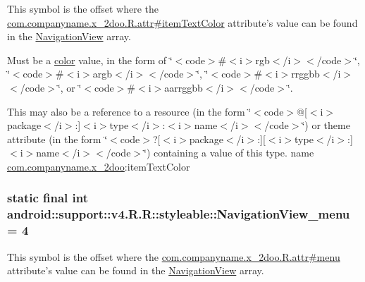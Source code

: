 This symbol is the offset where the \hyperlink{classcom_1_1companyname_1_1x__2doo_1_1_r_1_1attr_6d1d4faf528fcb60014cc0da91efab94}{com.companyname.x\_\-2doo.R.attr\#itemTextColor} attribute's value can be found in the \hyperlink{classandroid_1_1support_1_1v4_1_1_r_1_1styleable_5278cd545a73a5a4af313995900ae2d8}{NavigationView} array.

Must be a \hyperlink{classandroid_1_1support_1_1v4_1_1_r_1_1color}{color} value, in the form of \char`\"{}$<$code$>$\#$<$i$>$rgb$<$/i$>$$<$/code$>$\char`\"{}, \char`\"{}$<$code$>$\#$<$i$>$argb$<$/i$>$$<$/code$>$\char`\"{}, \char`\"{}$<$code$>$\#$<$i$>$rrggbb$<$/i$>$$<$/code$>$\char`\"{}, or \char`\"{}$<$code$>$\#$<$i$>$aarrggbb$<$/i$>$$<$/code$>$\char`\"{}. 

This may also be a reference to a resource (in the form \char`\"{}$<$code$>$@\mbox{[}$<$i$>$package$<$/i$>$:\mbox{]}$<$i$>$type$<$/i$>$:$<$i$>$name$<$/i$>$$<$/code$>$\char`\"{}) or theme attribute (in the form \char`\"{}$<$code$>$?\mbox{[}$<$i$>$package$<$/i$>$:\mbox{]}\mbox{[}$<$i$>$type$<$/i$>$:\mbox{]}$<$i$>$name$<$/i$>$$<$/code$>$\char`\"{}) containing a value of this type.  name \hyperlink{namespacecom_1_1companyname_1_1x__2doo}{com.companyname.x\_\-2doo}:itemTextColor \hypertarget{classandroid_1_1support_1_1v4_1_1_r_1_1styleable_6c7bd4b9c988fb62f1fabb28c57b981a}{
\subsubsection[{NavigationView\_\-menu}]{\setlength{\rightskip}{0pt plus 5cm}static final int android::support::v4.R.R::styleable::NavigationView\_\-menu = 4}}
\label{classandroid_1_1support_1_1v4_1_1_r_1_1styleable_6c7bd4b9c988fb62f1fabb28c57b981a}


This symbol is the offset where the \hyperlink{classcom_1_1companyname_1_1x__2doo_1_1_r_1_1attr_fa221ba686f006e0a8bec2d75d7bcbe7}{com.companyname.x\_\-2doo.R.attr\#menu} attribute's value can be found in the \hyperlink{classandroid_1_1support_1_1v4_1_1_r_1_1styleable_5278cd545a73a5a4af313995900ae2d8}{NavigationView} array.

